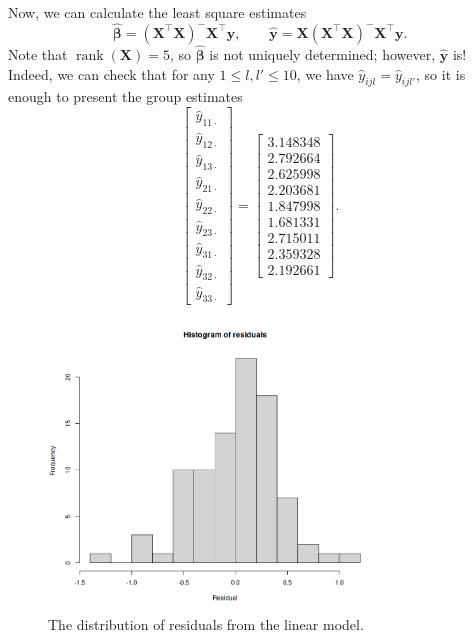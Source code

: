 \documentclass[10pt]{article}
\renewcommand{\vec}{\bm}
\DeclareMathOperator{\rank}{rank}
\begin{document}
    Now, we can calculate the least square estimates \[
        \hat{\vec{\beta}} = (\vec{X}^\top \vec{X})^- \vec{X}^\top \vec{y}, \qquad
        \hat{\vec{y}} = \vec{X}(\vec{X}^\top \vec{X})^- \vec{X}^\top \vec{y}.
    \] Note that $\rank(\vec{X}) = 5$, so $\hat{\vec{\beta}}$ is not uniquely
    determined; however, $\hat{\vec{y}}$ is! Indeed, we can check that for any $1
    \leq l, l' \leq 10$, we have $\hat{y}_{ijl} = \hat{y}_{ijl'}$, so it is enough to
    present the group estimates \[
        \begin{bmatrix}
            \hat{y}_{11\cdot} \\
            \hat{y}_{12\cdot} \\
            \hat{y}_{13\cdot} \\
            \hat{y}_{21\cdot} \\
            \hat{y}_{22\cdot} \\
            \hat{y}_{23\cdot} \\
            \hat{y}_{31\cdot} \\
            \hat{y}_{32\cdot} \\
            \hat{y}_{33\cdot}
        \end{bmatrix} = \begin{bmatrix}
            3.148348 \\
            2.792664 \\
            2.625998 \\
            2.203681 \\
            1.847998 \\
            1.681331 \\
            2.715011 \\
            2.359328 \\
            2.192661
        \end{bmatrix}. \tag{$*$}
    \]

    \begin{figure}[H]
    \begin{center}
        \includegraphics[width=0.8\textwidth]{residuals.png}
    \end{center}
    \caption{The distribution of residuals from the linear model.}
    \label{fig:residuals}
    \end{figure}
\end{document}
